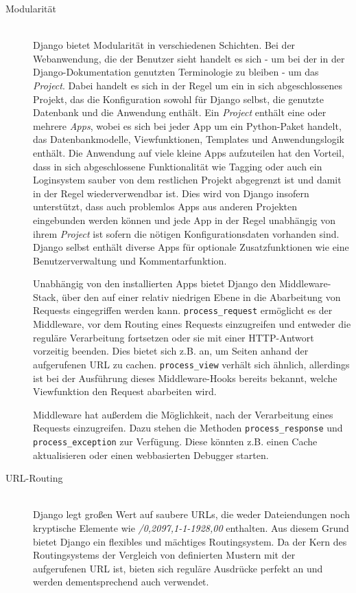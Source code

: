 \begin{description}
\item[Modularität] \hfill \\
Django bietet Modularität in verschiedenen Schichten. Bei der Webanwendung, die der Benutzer sieht
handelt es sich - um bei der in der Django-Dokumentation genutzten Terminologie zu bleiben - um das
\emph{Project}. Dabei handelt es sich in der Regel um ein in sich abgeschlossenes Projekt, das die
Konfiguration sowohl für Django selbst, die genutzte Datenbank und die Anwendung enthält. Ein
\emph{Project} enthält eine oder mehrere \emph{Apps}, wobei es sich bei jeder App um ein
Python-Paket handelt, das Datenbankmodelle, Viewfunktionen, Templates und Anwendungslogik enthält.
Die Anwendung auf viele kleine Apps aufzuteilen hat den Vorteil, dass in sich
abgeschlossene Funktionalität wie Tagging oder auch ein Loginsystem sauber von dem
restlichen Projekt abgegrenzt ist und damit in der Regel wiederverwendbar ist. Dies wird von Django
insofern unterstützt, dass auch problemlos Apps aus anderen Projekten eingebunden werden können und
jede App in der Regel unabhängig von ihrem \emph{Project} ist sofern die nötigen Konfigurationsdaten
vorhanden sind. Django selbst enthält diverse Apps für optionale Zusatzfunktionen wie eine
Benutzerverwaltung und Kommentarfunktion.

Unabhängig von den installierten Apps bietet Django den Middleware-Stack, über den auf einer relativ
niedrigen Ebene in die Abarbeitung von Requests eingegriffen werden kann.
\lstinline{process_request} ermöglicht es der Middleware, vor dem Routing eines Requests
einzugreifen und entweder die reguläre Verarbeitung fortsetzen oder sie mit einer HTTP-Antwort
vorzeitig beenden. Dies bietet sich z.B. an, um Seiten anhand der aufgerufenen URL zu cachen.
\lstinline{process_view} verhält sich ähnlich, allerdings ist bei der Ausführung dieses
Middleware-Hooks bereits bekannt, welche Viewfunktion den Request abarbeiten wird.

Middleware hat außerdem die Möglichkeit, nach der Verarbeitung eines Requests einzugreifen. Dazu
stehen die Methoden \lstinline{process_response} und \lstinline{process_exception} zur Verfügung.
Diese könnten z.B. einen Cache aktualisieren oder einen webbasierten Debugger starten.


\item[URL-Routing] \hfill \\
Django legt großen Wert auf saubere URLs, die weder Dateiendungen noch kryptische Elemente wie
\emph{/0,2097,1-1-1928,00} enthalten. Aus diesem Grund bietet Django ein flexibles
und mächtiges Routingsystem. Da der Kern des Routingsystems der Vergleich von definierten Mustern
mit der aufgerufenen URL ist, bieten sich reguläre Ausdrücke perfekt an und werden dementsprechend
auch verwendet.


\end{description}
